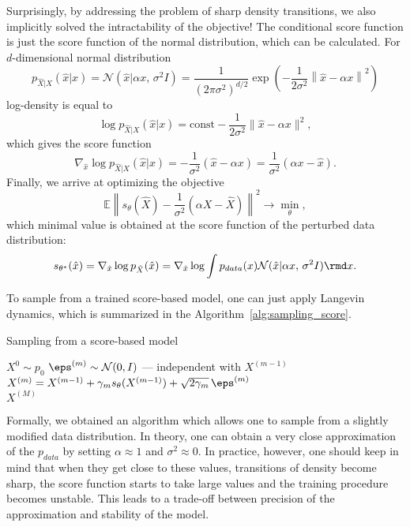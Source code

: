 Surprisingly, by addressing the problem of sharp density transitions, we also implicitly solved the intractability of the objective! The conditional score function is just the score function of the normal distribution, which can be calculated. For $d$-dimensional normal distribution
\[
    p_{\hat{X} | X}(\hat{x} | x) = \mathcal{N}(\hat{x} | \alpha x,\, \sigma^2 I) = \frac{1}{(2 \pi \sigma^2)^{d/2}}\exp\left(-\frac{1}{2\sigma^2}\left\| \hat{x} - \alpha x \right\|^2 \right)
\]
log-density is equal to
\[
    \log p_{\hat{X} | X}(\hat{x} | x) = \text{const} - \frac{1}{2\sigma^2}\|\hat{x} - \alpha x\|^2,
\]
which gives the score function
\[
    \nabla_{\hat{x}} \log p_{\hat{X} | X}(\hat{x} | x) = -\frac{1}{\sigma^2} (\hat{x} - \alpha x) = \frac{1}{\sigma^2}(\alpha x - \hat{x}).
\]
Finally, we arrive at optimizing the objective
\[
    \mathbb{E} \left\| s_\theta(\hat{X}) - \frac{1}{\sigma^2}(\alpha X - \hat{X}) \right\|^2 \rightarrow \min\limits_{\theta},
\]
which minimal value is obtained at the score function of the perturbed data distribution:
\[
    s_{\theta^*}(\hat{x}) = \nabla_{\hat{x}} \log p_{\hat{X}}(\hat{x}) = \nabla_{\hat{x}} \log \int p_{data}(x) \mathcal{N}(\hat{x} | \alpha x, \, \sigma^2 I)\rmd x.
\]

To sample from a trained score-based model, one can just apply Langevin dynamics, which is summarized in the Algorithm~\ref{alg:sampling_score}.
\begin{algorithm}
\caption{Sampling from a score-based model}\label{alg:sampling_score}
\begin{algorithmic}
\State $X^{0} \sim p_0$
    \State $\eps^{(m)} \sim \mathcal{N}(0, I)$ --- independent with $X^{(m - 1)}$
    \State $X^{(m)} = X^{(m - 1)} + \gamma_m s_\theta(X^{(m - 1)}) + \sqrt{2 \gamma_m}\, \eps^{(m)}$ 
\EndFor \\
\Return $X^{(M)}$
\end{algorithmic}
\end{algorithm}

Formally, we obtained an algorithm which allows one to sample from a slightly modified data distribution. In theory, one can obtain a very close approximation of the $p_{data}$ by setting $\alpha \approx 1$ and $\sigma^2 \approx 0$. In practice, however, one should keep in mind that when they get close to these values, transitions of density become sharp, the score function starts to take large values and the training procedure becomes unstable. This leads to a trade-off between precision of the approximation and stability of the model.

